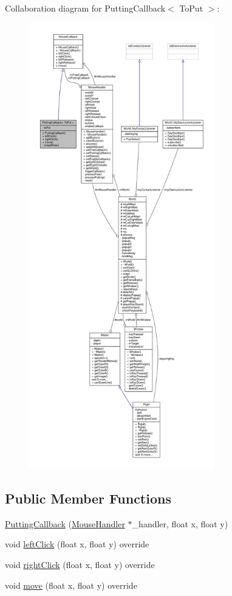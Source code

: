 Collaboration diagram for Putting\+Callback$<$ To\+Put $>$\+:
\nopagebreak
\begin{figure}[H]
\begin{center}
\leavevmode
\includegraphics[height=550pt]{classPuttingCallback__coll__graph}
\end{center}
\end{figure}
\subsection*{Public Member Functions}
\begin{DoxyCompactItemize}
\item 
\hyperlink{classPuttingCallback_abd83a02e857748d0ec88e30fcf08eb5e}{Putting\+Callback} (\hyperlink{classMouseHandler}{Mouse\+Handler} $\ast$\+\_\+handler, float x, float y)
\item 
void \hyperlink{classPuttingCallback_a95d8a7c64a5c1967982c0e6ef0d36969}{left\+Click} (float x, float y) override
\item 
void \hyperlink{classPuttingCallback_a9be086c4e02d2d9911876bbe17840f10}{right\+Click} (float x, float y) override
\item 
void \hyperlink{classPuttingCallback_a9d82e38a9f790cbfeb4bf24f81110deb}{move} (float x, float y) override
\end{DoxyCompactItemize}
